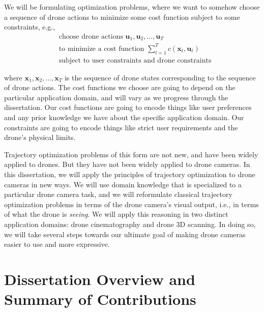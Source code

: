 \noindent We will be formulating optimization problems, where we want to somehow choose a sequence of drone actions to minimize some cost function subject to some constraints, e.g.,
~
\begin{equation*}
\begin{aligned}
& \text{choose drone actions } \mathbf{u}_1, \mathbf{u}_2, \ldots, \mathbf{u}_T\\
& \text{to minimize a cost function } \sum_{t=1}^T c( \mathbf{x}_t, \mathbf{u}_t)\\
& \text{subject to user constraints and drone constraints}
\end{aligned}
\end{equation*}

\noindent where $\mathbf{x}_1, \mathbf{x}_2, \ldots, \mathbf{x}_T$ is the sequence of drone states corresponding to the sequence of drone actions.
The cost functions we choose are going to depend on the particular application domain, and will vary as we progress through the dissertation.
Our cost functions are going to encode things like user preferences and any prior knowledge we have about the specific application domain.
Our constraints are going to encode things like strict user requirements and the drone's physical limits.

Trajectory optimization problems of this form are not new, and have been widely applied to drones.
But they have not been widely applied to drone cameras.
In this dissertation, we will apply the principles of trajectory optimization to drone cameras in new ways.
We will use domain knowledge that is specialized to a particular drone camera task, and we will reformulate classical trajectory optimization problems in terms of the drone camera's visual output, i.e., in terms of what the drone is \emph{seeing}.
We will apply this reasoning in two distinct application domains: drone cinematography and drone 3D scanning.
In doing so, we will take several steps towards our ultimate goal of making drone cameras easier to use and more expressive.

\section{Dissertation Overview and Summary of Contributions}

